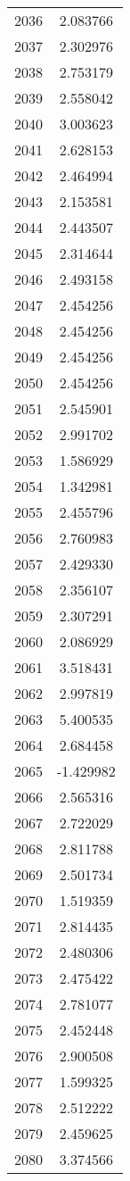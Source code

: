 \documentclass[12pt]{article}
\begin{document}
\begin{longtable}{@{}cc@{}}
2036 & 2.083766 \\
2037 & 2.302976 \\
2038 & 2.753179 \\
2039 & 2.558042 \\
2040 & 3.003623 \\
2041 & 2.628153 \\
2042 & 2.464994 \\
2043 & 2.153581 \\
2044 & 2.443507 \\
2045 & 2.314644 \\
2046 & 2.493158 \\
2047 & 2.454256 \\
2048 & 2.454256 \\
2049 & 2.454256 \\
2050 & 2.454256 \\
2051 & 2.545901 \\
2052 & 2.991702 \\
2053 & 1.586929 \\
2054 & 1.342981 \\
2055 & 2.455796 \\
2056 & 2.760983 \\
2057 & 2.429330 \\
2058 & 2.356107 \\
2059 & 2.307291 \\
2060 & 2.086929 \\
2061 & 3.518431 \\
2062 & 2.997819 \\
2063 & 5.400535 \\
2064 & 2.684458 \\
2065 & -1.429982 \\
2066 & 2.565316 \\
2067 & 2.722029 \\
2068 & 2.811788 \\
2069 & 2.501734 \\
2070 & 1.519359 \\
2071 & 2.814435 \\
2072 & 2.480306 \\
2073 & 2.475422 \\
2074 & 2.781077 \\
2075 & 2.452448 \\
2076 & 2.900508 \\
2077 & 1.599325 \\
2078 & 2.512222 \\
2079 & 2.459625 \\
2080 & 3.374566 \\

\end{longtable}
\end{document}
